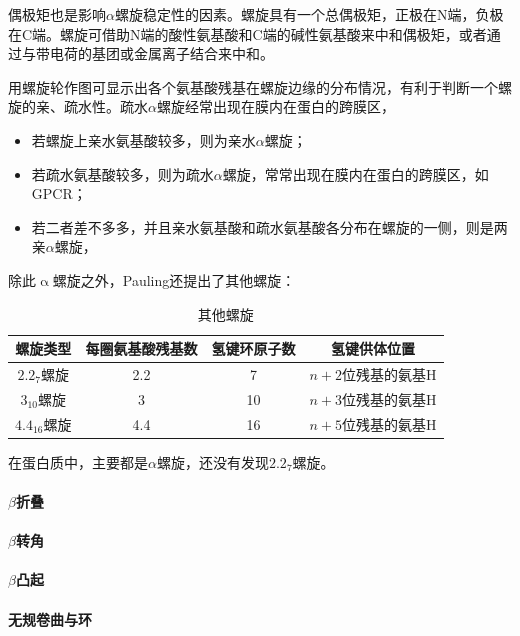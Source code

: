 偶极矩也是影响$\alpha$螺旋稳定性的因素。螺旋具有一个总偶极矩，正极在N端，负极在C端。螺旋可借助N端的酸性氨基酸和C端的碱性氨基酸来中和偶极矩，或者通过与带电荷的基团或金属离子结合来中和。

用螺旋轮作图可显示出各个氨基酸残基在螺旋边缘的分布情况，有利于判断一个螺旋的亲、疏水性。疏水$\alpha$螺旋经常出现在膜内在蛋白的跨膜区，

\begin{itemize}
	\item 若螺旋上亲水氨基酸较多，则为亲水$\alpha$螺旋；
	\item 若疏水氨基酸较多，则为疏水$\alpha$螺旋，常常出现在膜内在蛋白的跨膜区，如GPCR；
	\item 若二者差不多多，并且亲水氨基酸和疏水氨基酸各分布在螺旋的一侧，则是两亲$\alpha$螺旋，
\end{itemize}

除此$\upalpha$螺旋之外，Pauling还提出了其他螺旋：

\begin{table}[htbp]
	\centering
	\begin{tabularx}{\textwidth}{|c|c|c|C|}
		\hline
		螺旋类型 & 每圈氨基酸残基数 & 氢键环原子数 & 氢键供体位置 \\ \hline
		$2.2_{7}$螺旋 & 2.2 & 7 & $n+2$位残基的氨基H \\ \hline
		$3_{10}$螺旋 & 3 & 10 & $n+3$位残基的氨基H \\ \hline
		$4.4_{16}$螺旋 & 4.4 & 16 & $n+5$位残基的氨基H \\ \hline
	\end{tabularx}
	\caption{其他螺旋}
	\label{tab:many_helix}
\end{table}

在蛋白质中，主要都是$\alpha$螺旋，还没有发现$2.2_{7}$螺旋。

\paragraph{$\beta$折叠}

\paragraph{$\beta$转角}

\paragraph{$\beta$凸起}

\paragraph{无规卷曲与环}

